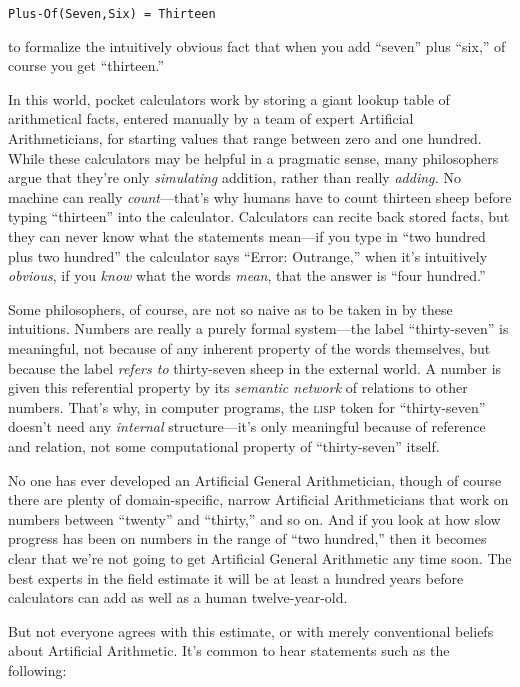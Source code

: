 {\begin{center}
\texttt{Plus-Of(Seven,Six) = Thirteen}
\end{center}

{
 to formalize the intuitively obvious fact that when you add
``seven'' plus
``six,'' of course you get
``thirteen.'' }

{
 In this world, pocket calculators work by storing a giant lookup
table of arithmetical facts, entered manually by a team of expert
Artificial Arithmeticians, for starting values that range between zero
and one hundred. While these calculators may be helpful in a pragmatic
sense, many philosophers argue that they're only
\textit{simulating} addition, rather than really \textit{adding.} No
machine can really \textit{count}{}---that's why humans
have to count thirteen sheep before typing
``thirteen'' into the calculator.
Calculators can recite back stored facts, but they can never know what
the statements mean---if you type in ``two hundred
plus two hundred'' the calculator says
``Error: Outrange,'' when
it's intuitively \textit{obvious}, if you \textit{know}
what the words \textit{mean}, that the answer is
``four hundred.''}

{
 Some philosophers, of course, are not so naive as to be taken in
by these intuitions. Numbers are really a purely formal system---the
label ``thirty-seven'' is
meaningful, not because of any inherent property of the words
themselves, but because the label \textit{refers to} thirty-seven sheep
in the external world. A number is given this referential property by
its \textit{semantic network} of relations to other numbers.
That's why, in computer programs, the \textsc{lisp} token for
``thirty-seven''
doesn't need any \textit{internal}
structure---it's only meaningful because of reference
and relation, not some computational property of
``thirty-seven'' itself.}

{
 No one has ever developed an Artificial General Arithmetician,
though of course there are plenty of domain-specific, narrow Artificial
Arithmeticians that work on numbers between
``twenty'' and
``thirty,'' and so on. And if you
look at how slow progress has been on numbers in the range of
``two hundred,'' then it becomes
clear that we're not going to get Artificial General
Arithmetic any time soon. The best experts in the field estimate it
will be at least a hundred years before calculators can add as well as
a human twelve-year-old.}

{
 But not everyone agrees with this estimate, or with merely
conventional beliefs about Artificial Arithmetic. It's
common to hear statements such as the following:}

}
